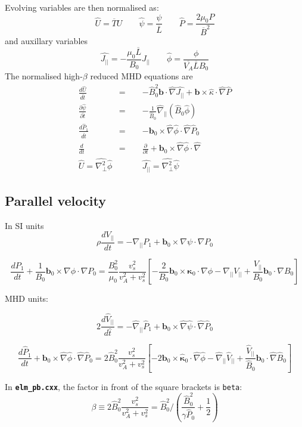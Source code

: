 \documentclass[12pt, a4paper]{article}
\newcommand{\code}[1]{\texttt{#1}}
\newcommand{\file}[1]{\texttt{\bf #1}}
\newcommand{\deriv}[2]{\ensuremath{\frac{\partial #1}{\partial #2}}}
\newcommand{\Vec}[1]{\ensuremath{\mathbf{#1}}}
\newcommand{\bvec}{\Vec{b}}
\newcommand{\Bbar}{\overline{B}}
\newcommand{\Lbar}{\overline{L}}
\newcommand{\Tbar}{\overline{T}}
\newcommand{\Jpar}{J_{||}}
\newcommand{\delp}{\nabla_\perp^2}
\begin{document}
Evolving variables are then normalised as:
\[
\hat{U} = \Tbar U \qquad \hat{\psi} = \frac{\psi}{\Lbar} \qquad \hat{P} = \frac{2\mu_0 P}{\Bbar^2}
\]
and auxillary variables
\[
\hat{\Jpar} = -\frac{\mu_0\Lbar}{B_0}\Jpar \qquad \hat{\phi} = \frac{\phi}{\overline{V_A}\Lbar B_0}
\]
The normalised high-$\beta$ reduced MHD equations are
\begin{eqnarray*}
\frac{d\hat{U}}{d\hat{t}} &=& -\hat{B}_0^2 \bvec\cdot\hat{\nabla}\hat{\Jpar} + \bvec\times\hat{\kappa}\cdot\hat{\nabla}\hat{P} \\
\deriv{\hat{\psi}}{\hat{t}} &=& -\frac{1}{\hat{B}_0}\hat{\nabla}_{||}\left(\hat{B}_0\hat{\phi}\right) \\
\frac{d\hat{P}_1}{d\hat{t}} &=& -\bvec_0\times\hat{\nabla}\hat{\phi}\cdot\hat{\nabla}\hat{P}_0 \\
\frac{d}{dt} &=& \deriv{}{t} + \bvec_0\times\hat{\nabla}\hat{\phi}\cdot\hat{\nabla} \\
\hat{U} = \hat{\delp}\hat{\phi}  &\qquad& \hat{\Jpar} = \hat{\delp}\hat{\psi}
\end{eqnarray*}

\subsection{Parallel velocity}
\label{sec:parvel}

In SI units
\[
\rho\frac{dV_{||}}{dt} = -\nabla_{||} P_1 + \mathbf{b}_0\times\nabla\psi\cdot\nabla P_0
\]

\[
\frac{dP_1}{dt} + \frac{1}{B_0}\mathbf{b}_0\times\nabla\phi\cdot\nabla P_0 = \frac{B_0^2}{\mu_0}\frac{v_s^2}{v_A^2 + v_s^2}\left[-\frac{2}{B_0}\mathbf{b}_0\times\mathbf{\kappa}_0\cdot\nabla\phi - \nabla_{||} V_{||} + \frac{V_{||}}{B_0}\mathbf{b}_0\cdot\nabla B_0\right] 
\]


MHD units:

\[
2\frac{d\hat{V}_{||}}{d\hat{t}} = - \hat{\nabla}_{||} \hat{P}_1 + \mathbf{b}_0\times\hat{\nabla}\hat{\psi}\cdot\hat{\nabla}\hat{P}_0
\]

\[
\frac{d\hat{P}_1}{dt} + \mathbf{b}_0\times\hat{\nabla}\hat{\phi}\cdot\hat{\nabla}\hat{P}_0 = 2\hat{B}_0^2 \frac{v_s^2}{v_A^2 + v_s^2}\left[-2\mathbf{b}_0\times\mathbf{\hat{\kappa}}_0\cdot\hat{\nabla}\hat{\phi} - \hat{\nabla}_{||} \hat{V}_{||} + \frac{\hat{V}_{||}}{\hat{B}_0}\mathbf{b}_0\cdot\hat{\nabla} \hat{B}_0\right] 
\]

In \file{elm\_pb.cxx}, the factor in front of the square brackets is \code{beta}:
\[
\beta \equiv 2\hat{B}_0^2 \frac{v_s^2}{v_A^2 + v_s^2} = \hat{B}_0^2 / \left(\frac{\hat{B}_0^2}{\gamma \hat{P}_0} + \frac{1}{2}\right)
\]
\end{document}
